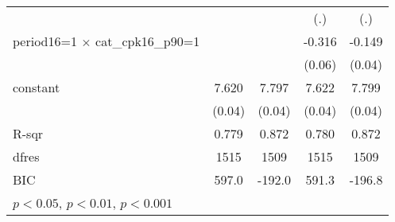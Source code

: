 {\begin{tabular}{l*{4}{c}}
                    &                     &                     &         (.)         &         (.)         \\
period16=1 $\times$ cat\_cpk16\_p90=1&                     &                     &      -0.316\sym{***}&      -0.149\sym{***}\\
                    &                     &                     &      (0.06)         &      (0.04)         \\
constant            &       7.620\sym{***}&       7.797\sym{***}&       7.622\sym{***}&       7.799\sym{***}\\
                    &      (0.04)         &      (0.04)         &      (0.04)         &      (0.04)         \\
\hline
R-sqr               &       0.779         &       0.872         &       0.780         &       0.872         \\
dfres               &        1515         &        1509         &        1515         &        1509         \\
BIC                 &       597.0         &      -192.0         &       591.3         &      -196.8         \\
\hline\hline
\multicolumn{5}{l}{\footnotesize \sym{*} \(p<0.05\), \sym{**} \(p<0.01\), \sym{***} \(p<0.001\)}\\
\end{tabular}
}
